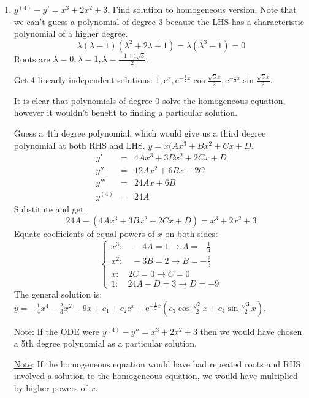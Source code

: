 \documentclass{article}
\newcommand{\mathe}{\mathrm{e}}
\newcommand{\mathi}{\mathrm{i}}
\newcommand{\nobracket}{}
\begin{document}
\begin{enumerate}
  \item $y^{(4)} - y' = x^3 + 2 x^2 + 3$. Find solution to homogeneous
  version. Note that we can't guess a polynomial of degree 3 because the LHS
  has a characteristic polynomial of a higher degree.
  \[ \lambda (\lambda - 1) (\lambda^2 + 2 \lambda + 1) = \lambda (\lambda^3 -
     1) = 0 \]
  Roots are $\lambda = 0, \lambda = 1, \lambda = \frac{- 1 \pm \mathi
  \sqrt{3}}{2}$.
  
  Get 4 linearly independent solutions: $1, \mathe^x, \mathe^{- \frac{1}{2} x}
  \cos \frac{\sqrt{3} x}{2}, \mathe^{- \frac{1}{2} x} \sin \frac{\sqrt{3}
  x}{2}$.
  
  It is clear that polynomials of degree 0 solve the homogeneous equation,
  however it wouldn't benefit to finding a particular solution.
  
  Guess a 4th degree polynomial, which would give us a third degree polynomial
  at both RHS and LHS. $y = x (Ax^3 + Bx^2 + Cx + D \nobracket$.
  \begin{eqnarray*}
    y' & = & 4 Ax^3 + 3 Bx^2 + 2 Cx + D\\
    y'' & = & 12 Ax^2 + 6 Bx + 2 C\\
    y''' & = & 24 Ax + 6 B\\
    y^{(4)} & = & 24 A
  \end{eqnarray*}
  Substitute and get:
  \[ 24 A - (4 Ax^3 + 3 Bx^2 + 2 Cx + D) = x^3 + 2 x^2 + 3 \]
  Equate coefficients of equal powers of $x$ on both sides:
  \[ \left\{\begin{array}{l}
       x^3 : \quad - 4 A = 1 \rightarrow A = - \frac{1}{4}\\
       x^2 : \quad - 3 B = 2 \rightarrow B = - \frac{2}{3}\\
       x : \quad 2 C = 0 \rightarrow C = 0\\
       1 : \quad 24 A - D = 3 \rightarrow D = - 9
     \end{array}\right. \]
  The general solution is: $y = - \frac{1}{4} x^4 - \frac{2}{3} x^2 - 9 x +
  c_1 + c_2 \mathe^x + \mathe^{- \frac{1}{2} x}  \left( c_3 \cos
  \frac{\sqrt{3}}{2} x + c_4 \sin \frac{\sqrt{3}}{2} x \right)$.
  
  {\underline{Note}}: If the ODE were $y^{(4)} - y'' = x^3 + 2 x^2 + 3$ then
  we would have chosen a 5th degree polynomial as a particular solution.
  
  {\underline{Note}}: If the homogeneous equation would have had repeated
  roots and RHS involved a solution to the homogeneous equation, we would have
  multiplied by higher powers of $x$.
  

\end{enumerate}
\end{document}
